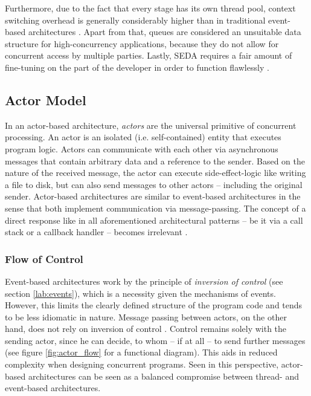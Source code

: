 Furthermore, due to the fact that every stage has its own thread pool, context switching overhead is generally considerably higher than in traditional event-based architectures \cite{seda}. Apart from that, queues are considered an unsuitable data structure for high-concurrency applications, because they do not allow for concurrent access by multiple parties. Lastly, SEDA requires a fair amount of fine-tuning on the part of the developer in order to function flawlessly \cite{event-architecture}.

\subsection{Actor Model}
\label{lab:actormodel}
In an actor-based architecture, \textit{actors} are the universal primitive of concurrent processing. An actor is an isolated (i.e. self-contained) entity that executes program logic. Actors can communicate with each other via asynchronous messages that contain arbitrary data and a reference to the sender. Based on the nature of the received message, the actor can execute side-effect-logic like writing a file to disk, but can also send messages to other actors -- including the original sender. Actor-based architectures are similar to event-based architectures in the sense that both implement communication via message-passing. The concept of a direct response like in all aforementioned architectural patterns -- be it via a call stack or a callback handler -- becomes irrelevant \cite{Haller2006}. 

\subsubsection*{Flow of Control}
Event-based architectures work by the principle of \textit{inversion of control} (see section \ref{lab:events}), which is a necessity given the mechanisms of events. However, this limits the clearly defined structure of the program code and tends to be less idiomatic in nature. Message passing between actors, on the other hand, does not rely on inversion of control \cite{Haller2006}. Control remains solely with the sending actor, since he can decide, to whom -- if at all -- to send further messages (see figure \ref{fig:actor_flow} for a functional diagram). This aids in reduced complexity when designing concurrent programs. Seen in this perspective, actor-based architectures can be seen as a balanced compromise between thread- and event-based architectures.

